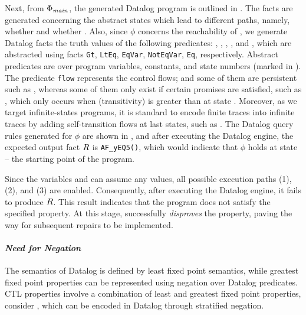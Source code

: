 Next, from $\Phi_{\mathit{main}}$, the generated Datalog program is outlined in . 
The facts are generated concerning the abstract states which lead to different paths, namely, whether  and whether . 
Also, since $\phi$ concerns the {reachability} of , we generate Datalog facts \wrt the truth values of the following predicates: , , , , and , which are abstracted using facts
\lstinline|Gt|, \lstinline|LtEq|, \lstinline|EqVar|, \lstinline|NotEqVar|, \lstinline|Eq|, respectively.  
Abstract predicates are over program variables, constants, and state numbers (marked in {}). 
The predicate \lstinline|flow| represents the control flows; 
and some of them are persistent such as , 
whereas some of them only exist if certain promises are satisfied, such as , which only occurs when (transitivity)  is greater than  at state . 
Moreover, as we target infinite-states programs, it is standard to 
encode finite traces into infinite traces by adding self-transition flows at last states, such as
. 
The Datalog query rules generated for $\phi$ are shown in , and after executing the Datalog engine, the expected output fact $R$ is \lstinline|AF_yEQ5(|\lstinline|)|, which would indicate that $\phi$ holds at state  -- the starting point of the program.  

Since the variables  and  can assume any values, all possible execution paths (1), (2), and (3) are enabled. Consequently, after executing the Datalog engine, it fails to produce $R$. This result indicates that the program does not satisfy the specified property. At this stage, \toolName successfully \emph{disproves} the property, paving the way for subsequent repairs to be implemented. 



\paragraph*{\bf \em Need for Negation}
The semantics of Datalog is defined by least fixed point semantics, while greatest fixed point properties can be represented using negation over Datalog predicates. CTL properties involve a combination of least and greatest fixed point properties, \eg consider , which can be encoded in Datalog through stratified negation. 

